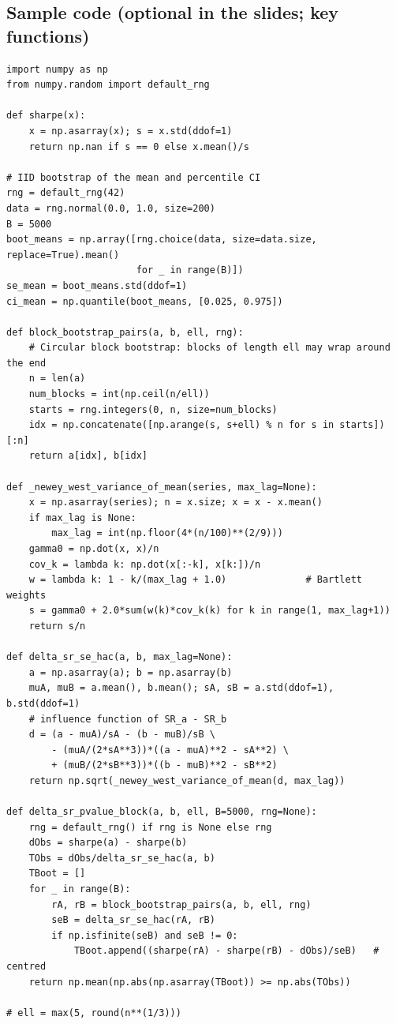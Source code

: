 \documentclass[11pt,a4paper]{report}
\begin{document}
\subsection*{Sample code (optional in the slides; key functions)}
\begin{lstlisting}
import numpy as np
from numpy.random import default_rng

def sharpe(x):
    x = np.asarray(x); s = x.std(ddof=1)
    return np.nan if s == 0 else x.mean()/s

# IID bootstrap of the mean and percentile CI
rng = default_rng(42)
data = rng.normal(0.0, 1.0, size=200)
B = 5000
boot_means = np.array([rng.choice(data, size=data.size, replace=True).mean()
                       for _ in range(B)])
se_mean = boot_means.std(ddof=1)
ci_mean = np.quantile(boot_means, [0.025, 0.975])

def block_bootstrap_pairs(a, b, ell, rng):
    # Circular block bootstrap: blocks of length ell may wrap around the end
    n = len(a)
    num_blocks = int(np.ceil(n/ell))
    starts = rng.integers(0, n, size=num_blocks)
    idx = np.concatenate([np.arange(s, s+ell) % n for s in starts])[:n]
    return a[idx], b[idx]

def _newey_west_variance_of_mean(series, max_lag=None):
    x = np.asarray(series); n = x.size; x = x - x.mean()
    if max_lag is None:
        max_lag = int(np.floor(4*(n/100)**(2/9)))
    gamma0 = np.dot(x, x)/n
    cov_k = lambda k: np.dot(x[:-k], x[k:])/n
    w = lambda k: 1 - k/(max_lag + 1.0)              # Bartlett weights
    s = gamma0 + 2.0*sum(w(k)*cov_k(k) for k in range(1, max_lag+1))
    return s/n

def delta_sr_se_hac(a, b, max_lag=None):
    a = np.asarray(a); b = np.asarray(b)
    muA, muB = a.mean(), b.mean(); sA, sB = a.std(ddof=1), b.std(ddof=1)
    # influence function of SR_a - SR_b
    d = (a - muA)/sA - (b - muB)/sB \
        - (muA/(2*sA**3))*((a - muA)**2 - sA**2) \
        + (muB/(2*sB**3))*((b - muB)**2 - sB**2)
    return np.sqrt(_newey_west_variance_of_mean(d, max_lag))

def delta_sr_pvalue_block(a, b, ell, B=5000, rng=None):
    rng = default_rng() if rng is None else rng
    dObs = sharpe(a) - sharpe(b)
    TObs = dObs/delta_sr_se_hac(a, b)
    TBoot = []
    for _ in range(B):
        rA, rB = block_bootstrap_pairs(a, b, ell, rng)
        seB = delta_sr_se_hac(rA, rB)
        if np.isfinite(seB) and seB != 0:
            TBoot.append((sharpe(rA) - sharpe(rB) - dObs)/seB)   # centred
    return np.mean(np.abs(np.asarray(TBoot)) >= np.abs(TObs))

# ell = max(5, round(n**(1/3)))
\end{lstlisting}
\end{document}
